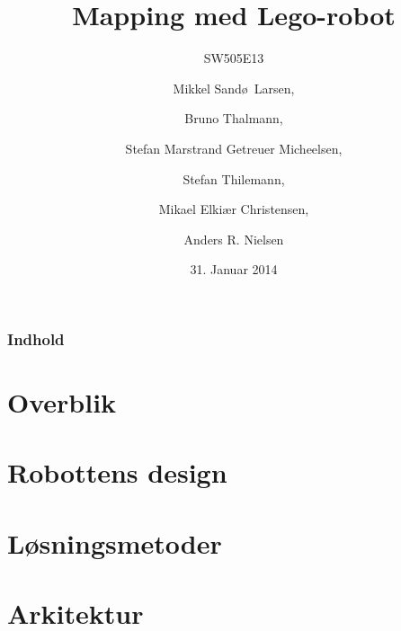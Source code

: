 \documentclass{beamer}
\title[Mapping med Lego-robot]{Mapping med Lego-robot}
\subtitle{SW505E13}
\author[SW505E13]{Mikkel Sand\o ~Larsen, \and Bruno Thalmann, \and Stefan Marstrand Getreuer Micheelsen, \and Stefan Thilemann, \and Mikael Elki\ae r Christensen, \and Anders R. Nielsen}
\institute[Aalborg University]
{
  Department of Computer Science\\
  Aalborg University}
\date[CFP 2003]{31. Januar 2014}
\begin{document}

\begin{frame}
  \titlepage
\end{frame}

\begin{frame}
    \frametitle{Indhold}
    \tableofcontents[sectionstyle=show/show,subsectionstyle=hide/hide/hide]
\end{frame}

\section{Overblik}





\section{Robottens design}

\section{Løsningsmetoder}

\section{Arkitektur}


\end{document}

